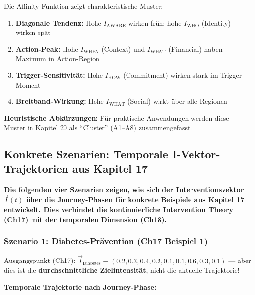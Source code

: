 Die Affinity-Funktion zeigt charakteristische Muster:

\begin{enumerate}
\item \textbf{Diagonale Tendenz:} Hohe $I_{\text{AWARE}}$ wirken früh; hohe $I_{\text{WHO}}$ (Identity) wirken spät
\item \textbf{Action-Peak:} Hohe $I_{\text{WHEN}}$ (Context) und $I_{\text{WHAT}}$ (Financial) haben Maximum in Action-Region
\item \textbf{Trigger-Sensitivität:} Hohe $I_{\text{HOW}}$ (Commitment) wirken stark im Trigger-Moment
\item \textbf{Breitband-Wirkung:} Hohe $I_{\text{WHAT}}$ (Social) wirkt über alle Regionen
\end{enumerate}

\textbf{Heuristische Abkürzungen:} Für praktische Anwendungen werden diese Muster in Kapitel 20 als ``Cluster'' (A1--A8) zusammengefasst.


\subsection{Konkrete Szenarien: Temporale I-Vektor-Trajektorien aus Kapitel 17}

\textbf{Die folgenden vier Szenarien zeigen, wie sich der Interventionsvektor $\vec{I}(t)$ über die Journey-Phasen für konkrete Beispiele aus Kapitel 17 entwickelt. Dies verbindet die kontinuierliche Intervention Theory (Ch17) mit der temporalen Dimension (Ch18).}

\subsubsection{Szenario 1: Diabetes-Prävention (Ch17 Beispiel 1)}

Ausgangspunkt (Ch17): $\vec{I}_{\text{Diabetes}} = (0.2, 0.3, 0.4, 0.2, 0.1, 0.1, 0.6, 0.3, 0.1)$ — aber dies ist die \textbf{durchschnittliche Zielintensität}, nicht die aktuelle Trajektorie!

\textbf{Temporale Trajektorie nach Journey-Phase:}

